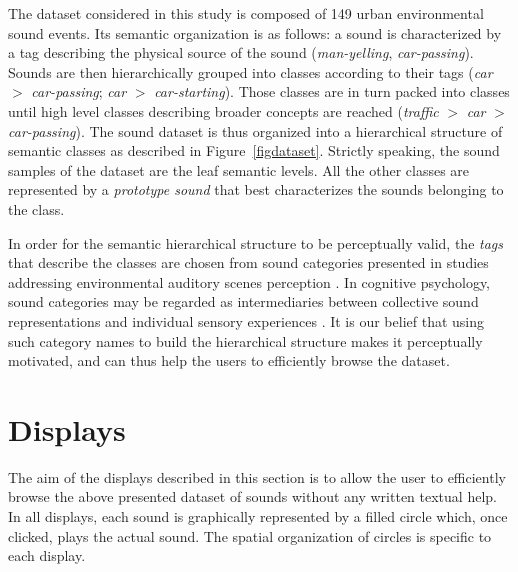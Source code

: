 \documentclass{aes2e}
\begin{document}
The dataset considered in this study is composed of 149 urban environmental sound events. Its semantic organization is as follows: a sound is characterized by a tag describing the physical source of the sound (\textit{man-yelling}, \textit{car-passing}). Sounds are then hierarchically grouped into classes according to their tags (\textit{car} $>$ \textit{car-passing}; \textit{car} $>$ \textit{car-starting}). Those classes are in turn packed into classes until high level classes describing broader concepts are reached (\textit{traffic} $>$ \textit{car} $>$ \textit{car-passing}). The sound dataset is thus organized into a hierarchical structure of semantic classes as described in Figure~\ref{figdataset}. Strictly speaking, the sound samples of the dataset are the leaf semantic levels. All the other classes are represented by a \textit{prototype sound} that best characterizes the sounds belonging to the class. 

In order for the semantic hierarchical structure to be perceptually valid, the \textit{tags} that describe the classes  are chosen from sound categories presented in studies addressing environmental auditory scenes perception \cite{niessen2010categories, brown2011towards, dubois2006cognitive}. In cognitive psychology, sound categories may be regarded as intermediaries between collective sound representations and individual sensory experiences \cite{dubois2006cognitive}. It is our belief that using such category names to build the hierarchical structure makes it perceptually motivated, and can thus help the users to efficiently browse the dataset.


\section{Displays} \label{display}

The aim of the displays described in this section is to allow the user to efficiently browse the above presented dataset of sounds without any written textual help. In all displays, each sound is graphically represented by a filled circle which, once clicked, plays the actual sound. The spatial organization of circles is specific to each display.
\end{document}
